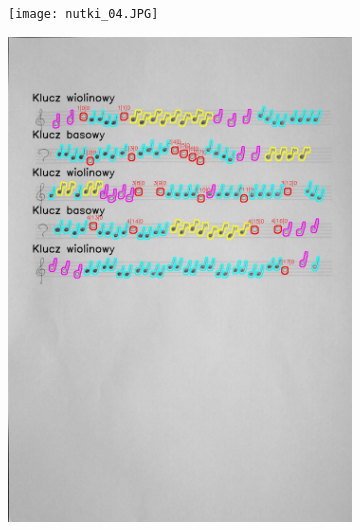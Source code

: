 \documentclass[11pt]{article}
\begin{document}
    \begin{figure}[H]
        \centering
        \begin{subfigure}{.5\textwidth}
            \centering
            \graphicspath{ {Resources/} }
            \texttt{[image: nutki\_04.JPG]}
            \label{figsub1}
        \end{subfigure}%
        \begin{subfigure}{.5\textwidth}
            \centering
            \graphicspath{ {keys/} }
            \includegraphics[width=\linewidth]{image_4.jpg}
            \label{figsub2}
        \end{subfigure}
        \label{figwykKlucze01}
    \end{figure}
\end{document}
